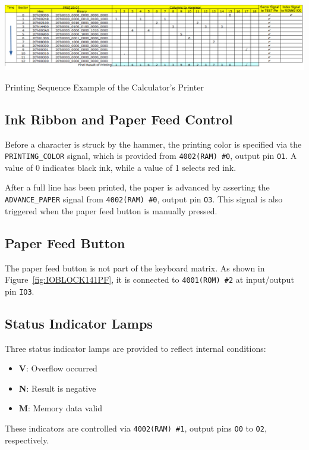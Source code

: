 \begin{table}[htbp]
    \includegraphics[width=1.00\columnwidth]{./Table/PrintSequence.png}
    \caption{Printing Sequence Example of the Calculator's Printer}
    \label{tb:PRINTSEQUENCE}
\end{table}

\subsection{Ink Ribbon and Paper Feed Control}
Before a character is struck by the hammer, the printing color is specified via the \texttt{PRINTING\_COLOR} signal, which is provided from \texttt{4002(RAM) \#0}, output pin \texttt{O1}. A value of 0 indicates black ink, while a value of 1 selects red ink.

After a full line has been printed, the paper is advanced by asserting the \texttt{ADVANCE\_PAPER} signal from \texttt{4002(RAM) \#0}, output pin \texttt{O3}. This signal is also triggered when the paper feed button is manually pressed.

\subsection{Paper Feed Button}
The paper feed button is not part of the keyboard matrix. As shown in Figure~\ref{fig:IOBLOCK141PF}, it is connected to \texttt{4001(ROM) \#2} at input/output pin \texttt{IO3}.

\subsection{Status Indicator Lamps}
Three status indicator lamps are provided to reflect internal conditions:
\begin{itemize}
  \item \textbf{V}: Overflow occurred
  \item \textbf{N}: Result is negative
  \item \textbf{M}: Memory data valid
\end{itemize}
These indicators are controlled via \texttt{4002(RAM) \#1}, output pins \texttt{O0} to \texttt{O2}, respectively.

